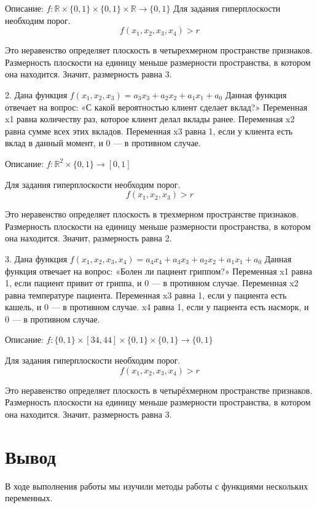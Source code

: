 \documentclass[14pt,a4paper]{extarticle}
\begin{document}
Описание: $f : \mathbb{R} \times\{0, 1\}\times\{0, 1\}\times\mathbb{R} \rightarrow \{0, 1\}$
Для задания гиперплоскости необходим порог.
\begin{equation*}
    f(x_1, x_2, x_3, x_4) > r
\end{equation*}

Это неравенство определяет плоскость в четырехмерном пространстве
признаков. Размерность плоскости на единицу меньше размерности
пространства, в котором она находится. Значит, размерность равна 3.

2. Дана функция \(f(x_1, x_2, x_3) = a_3 x_3 + a_2 x_2 + a_1 x_1 + a_0\)
Данная функция отвечает на вопрос: «С какой вероятностью клиент
сделает вклад?» Переменная x1 равна количеству раз, которое клиент
делал вклады ранее. Переменная x2 равна сумме всех этих вкладов.
Переменная x3 равна 1, если у клиента есть вклад в данный момент,
и 0 — в противном случае.

Описание: $f: \mathbb{R}^2 \times \{0, 1\} \rightarrow [0, 1] $

Для задания гиперплоскости необходим порог.
\begin{equation*}
    f(x_1, x_2, x_3) > r
\end{equation*}

Это неравенство определяет плоскость в трехмерном пространстве
признаков. Размерность плоскости на единицу меньше размерности
пространства, в котором она находится. Значит, размерность равна 2.

3. Дана функция \(f(x_1, x_2, x_3, x_4) = a_4 x_4 + a_3 x_3 + a_2 x_2 + a_1 x_1 + a_0\)
Данная функция отвечает на вопрос: «Болен ли пациент гриппом?»
Переменная x1 равна 1, если пациент привит от гриппа, и 0 — в
противном случае. Переменная x2 равна температуре пациента.
Переменная x3 равна 1, если у пациента есть кашель, и 0 — в
противном случае. x4 равна 1, если у пациента есть насморк,
и 0 — в противном случае.

Описание: $f: \{0, 1\}\times [34, 44]\times\{0, 1\}\times\{0, 1\} \rightarrow \{0, 1\} $

Для задания гиперплоскости необходим порог.
\begin{equation*}
    f(x_1, x_2, x_3, x_4) > r
\end{equation*}

Это неравенство определяет плоскость в четырёхмерном пространстве
признаков. Размерность плоскости на единицу меньше размерности
пространства, в котором она находится. Значит, размерность равна 3.

\section*{Вывод}
В ходе выполнения работы мы изучили методы работы с функциями нескольких
переменных.
\end{document}
